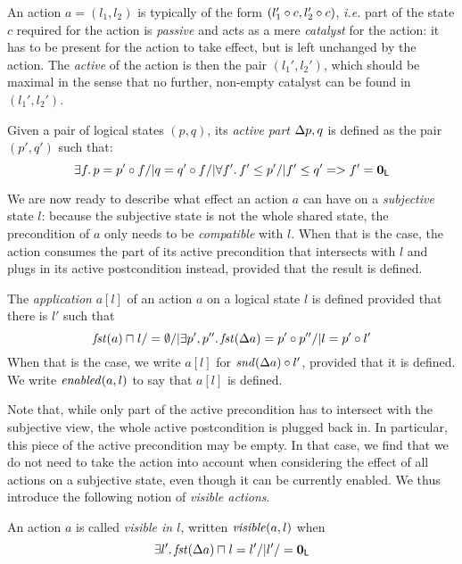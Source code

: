 An action $a = (l_1, l_2)$ is typically of the form $(l_1'\circ c,
l_2'\circ c)$, \textit{i.e.} part of the state $c$ required for
the action is \emph{passive} and acts as a mere \emph{catalyst} for
the action: it has to be present for the action to take effect, but is
left unchanged by the action. The \emph{active} of the action is then
the pair $(l_1',l_2')$, which should be maximal in the sense that no
further, non-empty catalyst can be found in $(l_1',l_2')$.

\begin{definition}
  Given a pair of logical states $(p, q)$, its \emph{active part}
  $\Delta {p,q}$ is defined as the pair $(p', q')$ such that:
  \[
  \exists f.\, p = p' \circ f /| q = q' \circ f /| \forall f'.\, f'\leq p' /|
  f'\leq q' => f' = \mathbf{0}_{\textsf{L}}
  \]
\end{definition}

We are now ready to describe what effect an action $a$ can have on a
\emph{subjective} state $l$: because the subjective state is not the
whole shared state, the precondition of $a$ only needs to be
\emph{compatible} with $l$. When that is the case, the action consumes
the part of its active precondition that intersects with $l$ and plugs
in its active postcondition instead, provided that the result is
defined.

\begin{definition}
  The \emph{application} $a[l]$ of an action $a$ on a logical state
  $l$ is defined provided that there is $l'$ such that
  \[
    \mathit{fst}(a) \sqcap_{} l /=\emptyset /|
    \exists p',p''.\,
    \mathit{fst}(\Delta {a}) = p'\circ p'' /|
    l = p' \circ l'
  \]
  When that is the case, we write $a[l]$ for
  $\mathit{snd}(\Delta {a})\circ l'$, provided that it is defined. We
  write $\mathit{enabled}(a,l)$ to say that $a[l]$ is defined.
\end{definition}

Note that, while only part of the active precondition has to intersect
with the subjective view, the whole active postcondition is plugged
back in. In particular, this piece of the active precondition may be
empty. In that case, we find that we do not need to take the action
into account when considering the effect of all actions on a
subjective state, even though it can be currently enabled. We thus
introduce the following notion of \emph{visible actions}.

\begin{definition}
  An action $a$ is called \emph{visible in $l$}, written
  $\mathit{visible}(a,l)$ when
  \[
  \exists l'.\, \mathit{fst}(\Delta {a})\sqcap_{} l = l' /| l'/=\mathbf{0}_{\textsf{L}}
  \]
\end{definition}


